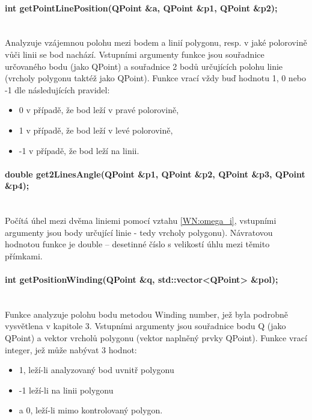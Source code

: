 \documentclass[11pt]{article}
\begin{document}
\paragraph{int getPointLinePosition(QPoint \&a, QPoint \&p1, QPoint \&p2);}\mbox{}\\
Analyzuje vzájemnou polohu mezi bodem a linií polygonu, resp. v jaké polorovině vůči linii se bod nachází. Vstupními argumenty funkce jsou souřadnice určovaného bodu (jako QPoint) a souřadnice 2 bodů určujících polohu linie (vrcholy polygonu taktéž jako QPoint). Funkce vrací vždy buď hodnotu 1, 0 nebo -1 dle následujících pravidel:

\begin{itemize}
\item 0 v případě, že bod leží v pravé polorovině,
\item 1 v případě, že  bod leží v levé polorovině,
\item -1 v případě, že bod leží na linii.
\end{itemize}

\paragraph{double get2LinesAngle(QPoint \&p1, QPoint \&p2, QPoint \&p3, QPoint \&p4);}\mbox{}\\
Počítá úhel mezi dvěma liniemi pomocí vztahu \ref{WN:omega_i}, vstupními argumenty jsou body určující linie -  tedy vrcholy polygonu). Návratovou hodnotou funkce je double – desetinné číslo s velikostí úhlu mezi těmito přímkami.  

\paragraph{int getPositionWinding(QPoint \&q, std::vector<QPoint> \&pol);}\mbox{}\\
Funkce analyzuje polohu bodu metodou Winding number, jež byla podrobně vysvětlena v kapitole 3.  Vstupními argumenty jsou souřadnice bodu Q (jako QPoint) a vektor vrcholů polygonu (vektor naplněný prvky QPoint). Funkce vrací integer, jež může nabývat 3 hodnot:

\begin{itemize}
\item 1, leží-li analyzovaný bod uvnitř polygonu
\item -1 leží-li na linii polygonu 
\item a 0, leží-li mimo kontrolovaný polygon.
\end{itemize}
\end{document}
